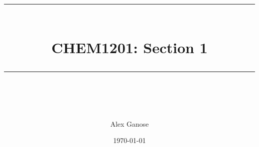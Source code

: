 \newcommand{\horrule}[1]{\rule{\linewidth}{#1}} %
\title{
	\normalfont \normalsize
	\horrule{0.5pt} \\[0.4cm]
	\huge CHEM1201: Section 1 \\
	\horrule{2pt} \\[0.5cm]
}

\author{Alex Ganose}
\date{\normalsize\today}